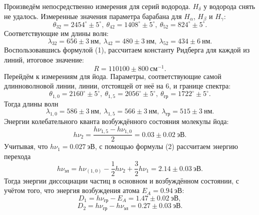 \documentclass[a4paper,12pt]{article}
\begin{document}
Произведём непосредственно измерения для серий водорода. $H_\delta$ у водорода снять не удалось. Измеренные значения параметра барабана для $H_\alpha$, $H_\beta$ и $H_\gamma$:
\[\theta_{32} = 2454^\circ \pm 5^\circ,~\theta_{42} = 1408^\circ \pm 5^\circ,~\theta_{52} = 824^\circ \pm 5^\circ.\]
Соответствующие им длины волн:
\[\lambda_{32} = 656 \pm 3~\text{нм},~\lambda_{42} = 480 \pm 3~\text{нм},~\lambda_{52} = 434 \pm 6~\text{нм}.\]
Воспользовавшись формулой (1), рассчитаем константу Ридберга для каждой из линий, итоговое значение:
\[R = 110100 \pm 800~\text{см}^{-1}.\]
Перейдём к измерениям для йода. Параметры, соответствующие самой длинноволновой линии, линии, отстоящей от неё на 6, и границе спектра:
\[\theta_{1,0} = 2160^\circ \pm 5^\circ,~\theta_{1,5} = 2056^\circ \pm 5^\circ,~\theta_{\text{гр}} = 1722^\circ \pm 5^\circ.\]
Тогда длины волн
\[\lambda_{1,0} = 586 \pm 3~\text{нм},~\lambda_{1,5} = 566 \pm 3~\text{нм},~\lambda_{\text{гр}} = 515 \pm 3~\text{нм}.\]
Энергии колебательного кванта возбуждённого состояния молекулы йода:
\[h\nu_{2} = \dfrac{h\nu_{1,5} - h\nu_{1,0}}{2} = 0.03 \pm 0.02~\text{эВ}.\]
Учитывая, что $h\nu_1 = 0.027~\text{эВ}$, с помощью формулы (2) рассчитаем энергию перехода
\[h\nu_{\text{эл}} = h\nu_{(1,0)} - \dfrac{1}{2} h\nu_2 + \dfrac{3}{2} h\nu_1 = 2.14 \pm 0.03~\text{эВ}.\]
Тогда энергии диссоциации частиц в основном и возбуждённом состоянии, с учётом того, что энергия возбуждения атома $E_A = 0.94~\text{эВ}$:
\[D_1 = h\nu_{\text{гр}} - E_A = 1.47 \pm 0.02~\text{эВ},\]
\[D_2 = h\nu_{\text{гр}} - h\nu_{\text{эл}} = 0.27 \pm 0.03~\text{эВ}.\]
\end{document}
